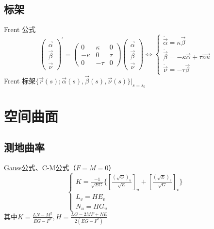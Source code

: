 \documentclass{article}                     %
\numberwithin{equation}{section}            %
\numberwithin{figure}{section}              %
\numberwithin{table}{section}               %
\begin{document}
\subsection{标架}
Frent 公式
\begin{equation*}
    \begin{pmatrix}
        \vec{\alpha }\\
        \vec{\beta }\\
        \vec{\nu }
    \end{pmatrix}^{\prime}
       =
    \begin{pmatrix}
         0& \kappa  &0 \\
         -\kappa & 0 & \tau \\
         0& -\tau  &0
    \end{pmatrix}
    \begin{pmatrix}
        \vec{\alpha }\\
        \vec{\beta }\\
        \vec{\nu }
    \end{pmatrix}
       \Longleftrightarrow 
    \left\{\begin{matrix}
       \dot{\vec{\alpha}}=\kappa \vec{\beta }  \\
       \dot{\vec{\beta}}=-\kappa\vec{\alpha}+\tau\vec{nu}\\
       \dot{\vec{\nu}}=-\tau\vec{\beta}
    \end{matrix}\right.
\end{equation*}
Frent 标架$\{\vec{r}(s);\vec{\alpha }(s),\vec{\beta }(s),\vec{\nu }(s)\}|_{s=s_0}$

\section{空间曲面}
\subsection{测地曲率}
Gauss公式、C-M公式（$F=M=0$）
\begin{equation*}
    \left\{\begin{matrix}
        K=\frac{-1}{\sqrt{EG} }\{[\frac{(\sqrt{G})_u }{\sqrt{E}} ]_u+[\frac{(\sqrt{E})_v }{\sqrt{G}} ]_v\} \\
        L_v=HE_v\\
        N_u=HG_u
       \end{matrix}\right.
\end{equation*}
其中$K=\frac{LN-M^2}{EG-F^2}, H=\frac{LG-2MF+NE}{2(EG-F^2)} $
\end{document}
